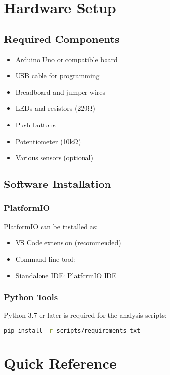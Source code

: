 \documentclass[12pt,a4paper]{book}
\begin{document}
\appendix

\chapter{Hardware Setup}

\section{Required Components}
\begin{itemize}
    \item Arduino Uno or compatible board
    \item USB cable for programming
    \item Breadboard and jumper wires
    \item LEDs and resistors (220Ω)
    \item Push buttons
    \item Potentiometer (10kΩ)
    \item Various sensors (optional)
\end{itemize}

\section{Software Installation}

\subsection{PlatformIO}
PlatformIO can be installed as:
\begin{itemize}
    \item VS Code extension (recommended)
    \item Command-line tool: 
    \item Standalone IDE: PlatformIO IDE
\end{itemize}

\subsection{Python Tools}
Python 3.7 or later is required for the analysis scripts:
\begin{lstlisting}[language=bash]
pip install -r scripts/requirements.txt
\end{lstlisting}

\chapter{Quick Reference}
\end{document}
